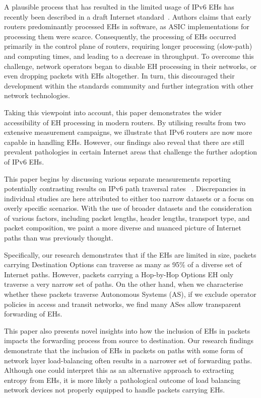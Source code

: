 \documentclass[conference]{IEEEtran}
\begin{document}
A plausible process that has resulted in the limited usage of IPv6 EHs
has recently been described in a draft Internet standard~\cite{ietf-v6ops-hbh-03}. Authors claims  that early routers
predominantly processed EHs in software, as ASIC implementations for processing
them were scarce. Consequently, the processing of EHs occurred
primarily in the control plane of routers, requiring longer processing
(slow-path) and computing times, and leading to a decrease in throughput.  To
overcome this challenge, network operators began to disable EH processing in their
networks, or even dropping packets with EHs altogether.  In turn, this
discouraged their development within the standards community and further integration
with other network technologies.

Taking this viewpoint into account, this paper demonstrates the wider
accessibility of EH processing in modern routers. By utilising results from two
extensive measurement campaigns, we illustrate that IPv6 routers are now more
capable in handling EHs.  However, our findings also reveal
that there are still prevalent pathologies in certain Internet areas that challenge the further adoption of IPv6 EHs.

This paper begins by discussing various separate measurements reporting
potentially contrasting results on IPv6 path traversal rates~\cite{RFC7872}
\cite{apnic} \cite{nalini-iepg114} \cite{james}.  Discrepancies in individual
studies are here attributed to either too narrow datasets or a focus
on overly specific scenarios.  With the use of broader datasets and the
consideration of various factors, including packet lengths, header lengths,
transport type, and packet composition, we paint a more diverse and nuanced
picture of Internet paths than was previously thought.

Specifically, our research demonstrates that if the EHs are limited in size,
packets carrying Destination Options can traverse as many as
95\% of a diverse set of Internet paths. However, packets carrying a Hop-by-Hop Options EH only traverse a very narrow set of paths. On the other hand, when we
characterise whether these packets traverse Autonomous Systems (AS), if we exclude operator policies in access and transit networks, we find many ASes allow transparent forwarding of EHs.

This paper also presents novel insights into how the inclusion of EHs in packets
impacts the forwarding process from source to destination. Our research findings
demonstrate that the inclusion of EHs in packets on paths with some form of network layer load-balancing often results in a narrower set of forwarding paths. Although one could interpret this as an
alternative approach to extracting entropy from EHs, it is more likely a
pathological outcome of load balancing network devices not properly equipped
to handle packets carrying EHs.
\end{document}
